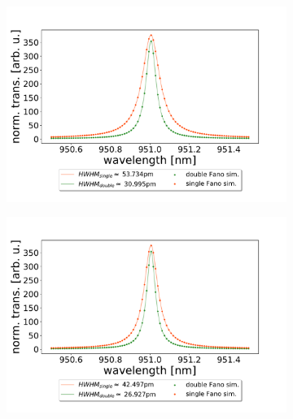\begin{figure}[h!]
    \centering
    \begin{subfigure}[b]{0.49\textwidth}
        \includegraphics[width=\textwidth]{figures/sim_single_vs_double_10um.pdf}
        \caption{}
        \label{fig:single_vs_double_simulation_10um}
    \end{subfigure}
    \begin{subfigure}[b]{0.49\textwidth}
        \includegraphics[width=\textwidth]{figures/sim_single_vs_double_30um.pdf}
        \caption{}
        \label{fig:single_vs_double_simulation_30um}
    \end{subfigure}
\end{figure}

